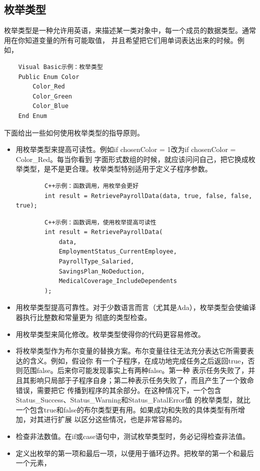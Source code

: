 \documentclass{article}
\begin{document}
\subsection{枚举类型}
枚举类型是一种允许用英语，来描述某一类对象中，每一个成员的数据类型。通常用在你知道变量的所有可能取值，
并且希望把它们用单词表达出来的时候。例如，
\begin{lstlisting}
    Visual Basic示例：枚举类型
    Public Enum Color
        Color_Red
        Color_Green
        Color_Blue
    End Enum
\end{lstlisting}
下面给出一些如何使用枚举类型的指导原则。
\begin{itemize}
    \item 用枚举类型来提高可读性。例如if chosenColor = 1改为if chosenColor = Color\_Red。每当你看到
    字面形式数组的时候，就应该问问自己，把它换成枚举类型，是不是更合理。枚举类型特别适用于定义子程序参数。
    \begin{lstlisting}
        C++示例：函数调用，用枚举会更好
        int result = RetrievePayrollData(data, true, false, false, true);
    \end{lstlisting}
    \begin{lstlisting}
        C++示例：函数调用，使用枚举提高可读性
        int result = RetrievePayrollData(
            data,
            EmploymentStatus_CurrentEmployee,
            PayrollType_Salaried,
            SavingsPlan_NoDeduction,
            MedicalCoverage_IncludeDependents
        );
    \end{lstlisting}
    \item 用枚举类型提高可靠性。对于少数语言而言（尤其是Ada），枚举类型会使编译器执行比整数和常量更为
    彻底的类型检查。
    \item 用枚举类型来简化修改。枚举类型使得你的代码更容易修改。
    \item 将枚举类型作为布尔变量的替换方案。布尔变量往往无法充分表达它所需要表达的含义。例如，假设你
    有一个子程序，在成功地完成任务之后返回true，否则范围false。后来你可能发现事实上有两种false。第一种
    表示任务失败了，并且其影响只局部于子程序自身；第二种表示任务失败了，而且产生了一个致命错误，需要把它
    传播到程序的其余部分。在这种情况下，一个包含Status\_Success、Status\_Warning和Status\_FatalError值
    的枚举类型，就比一个包含true和false的布尔类型更有用。如果成功和失败的具体类型有所增加，对其进行扩展
    以区分这些情况，也是非常容易的。
    \item 检查非法数值。在if或case语句中，测试枚举类型时，务必记得检查非法值。
    \item 定义出枚举的第一项和最后一项，以便用于循环边界。把枚举的第一个和最后一个元素，\\

\end{itemize}
\end{document}
